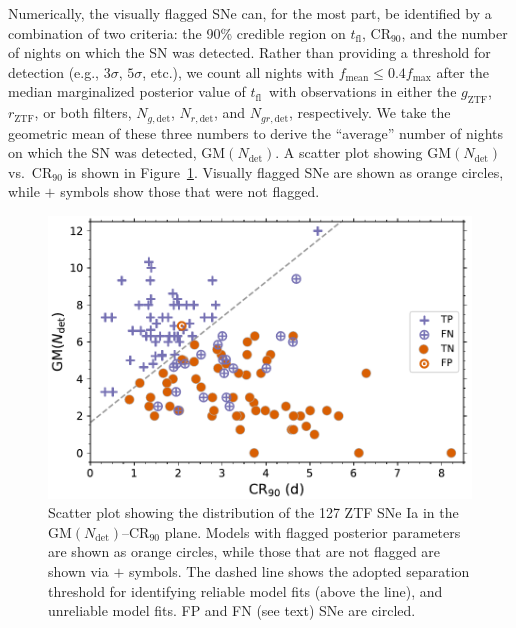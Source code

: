 \documentclass[twocolumn]{./aastex63}
\newcommand{\rztf}{$r_\mathrm{ZTF}$}
\newcommand{\gztf}{$g_\mathrm{ZTF}$}
\newcommand{\tfl}{$t_\mathrm{fl}$}
\begin{document}
Numerically, the visually flagged SNe can, for the most part, be identified
by a combination of two criteria: the 90\% credible region on \tfl,
$\mathrm{CR}_{90}$, and the number of nights on which the SN was detected.
Rather than providing a threshold for detection (e.g., $3\sigma$, $5\sigma$,
etc.), we count all nights with $f_\mathrm{mean} \le 0.4 f_\mathrm{max}$
after the median marginalized posterior value of \tfl\ with observations in
either the \gztf, \rztf, or both filters, $N_{g, \mathrm{det}}$, $N_{r,
\mathrm{det}}$, and $N_{gr, \mathrm{det}}$, respectively. We take the
geometric mean of these three numbers to derive the ``average'' number of
nights on which the SN was detected, $\mathrm{GM}(N_\mathrm{det})$. A scatter
plot showing $\mathrm{GM}(N_\mathrm{det})$ vs.\ $\mathrm{CR}_{90}$ is shown
in Figure~\ref{fig:flagged_sn}. Visually flagged SNe are shown as orange
circles, while $+$ symbols show those that were not flagged.

\begin{figure}
    \centering
    \includegraphics[width=5in]{./figures/final_sample.pdf}
    \caption{Scatter plot showing the distribution of the 127 ZTF SNe Ia in
    the $\mathrm{GM}(N_\mathrm{det})$--$\mathrm{CR}_{90}$ plane. Models with
    flagged posterior parameters are shown as orange circles, while those
    that are not flagged are shown via $+$ symbols. The dashed line shows the
    adopted separation threshold for identifying reliable model fits (above
    the line), and unreliable model fits. FP and FN (see text) SNe are
    circled. }
    \label{fig:flagged_sn}
\end{figure}
\end{document}
